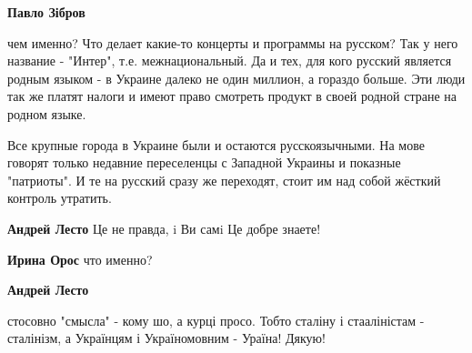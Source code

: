 \begin{itemize}
\begin{itemize}
 
\textbf{Павло Зібров} 

чем именно? Что делает какие-то концерты и программы на русском? Так у него
название - "Интер", т.е. межнациональный. Да и тех, для кого русский является
родным языком - в Украине далеко не один миллион, а гораздо больше. Эти люди
так же платят налоги и имеют право смотреть продукт в своей родной стране на
родном языке.

Все крупные города в Украине были и остаются русскоязычными. На мове говорят
только недавние переселенцы с Западной Украины и показные "патриоты". И те на
русский сразу же переходят, стоит им над собой жёсткий контроль утратить.

 
\textbf{Андрей Лесто} Це не правда, i Ви самi Це добре знаете!

 
\textbf{Ирина Орос} что именно?

 
\textbf{Андрей Лесто} 

стосовно "смысла" - кому шо, а курці просо. Тобто сталіну і стааліністам -
сталінізм, а Українцям і Україномовним - Ураїна! Дякую!


 

\end{itemize}
\end{itemize}
